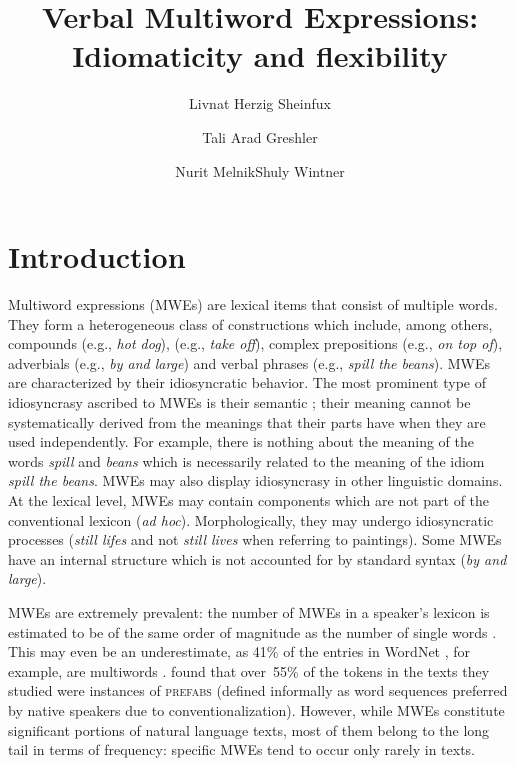\documentclass[output=paper]{langsci/langscibook}
\title{Verbal Multiword Expressions: Idiomaticity and flexibility}
\author{Livnat Herzig Sheinfux\affiliation{University of Haifa}\and Tali Arad Greshler\affiliation{University of Haifa}\and Nurit Melnik\affiliation{The Open University of Israel}\lastand Shuly Wintner\affiliation{University of Haifa}}
\begin{document}
\section{Introduction}
\label{she:sec:introduction}

Multiword expressions (MWEs) are lexical items that consist of
multiple words. They form a heterogeneous class of
constructions which include, among others, compounds (e.g., \textit{hot
  dog}),  (e.g., \textit{take off}), complex
prepositions (e.g., \textit{on top of}), adverbials (e.g., \textit{by and large})
and verbal phrases (e.g., \textit{spill the beans}). MWEs are characterized
by their idiosyncratic behavior. The most prominent type of
idiosyncrasy ascribed to MWEs is their semantic ; their
meaning cannot be systematically derived from the meanings that their
parts have when they are used independently.
For example, there is nothing about the meaning of the words \textit{spill} and \textit{beans} which is necessarily related to the meaning of the idiom \textit{spill the beans}.
MWEs may also display idiosyncrasy in other linguistic
domains. At the lexical level, MWEs may contain components which are
not part of the conventional lexicon (\textit{ad
  hoc}). Morphologically, they may undergo idiosyncratic processes
(\textit{still lifes} and not \textit{still lives} when referring to
paintings). Some MWEs have an internal structure which is not
accounted for by standard syntax (\textit{by and large}).

MWEs are extremely prevalent: the number of MWEs in a speaker's
lexicon is estimated to be of the same order of magnitude as the
number of single words \citep{jackendoff1997architecture}. This may even be an
underestimate, as 41\% of the entries in WordNet \citep{wordnet}, for
example, are multiwords \citep{sag02}.
\citet{erman:warren:2000} found that over~55\% of the tokens in the
texts they studied were instances of {\scshape prefabs} (defined
informally as word sequences preferred by native speakers due to
conventionalization).  However, while MWEs constitute significant
portions of natural language texts, most of them belong to the long
tail in terms of frequency: specific MWEs tend to occur only rarely in
texts.
\end{document}
